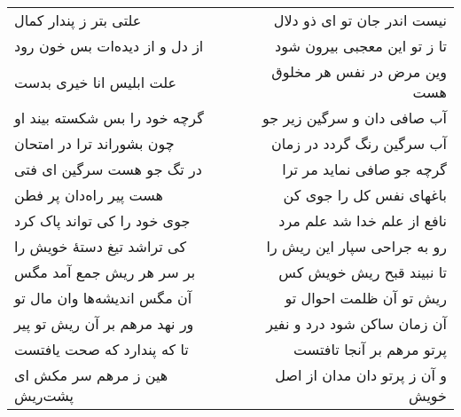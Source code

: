 \begin{center}
\begin{longtable}{l p{0.5cm} r}
\\
علتی بتر ز پندار کمال
&&
نیست اندر جان تو ای ذو دلال
\\
از دل و از دیده‌ات بس خون رود
&&
تا ز تو این معجبی بیرون شود
\\
علت ابلیس انا خیری بدست
&&
وین مرض در نفس هر مخلوق هست
\\
گرچه خود را بس شکسته بیند او
&&
آب صافی دان و سرگین زیر جو
\\
چون بشوراند ترا در امتحان
&&
آب سرگین رنگ گردد در زمان
\\
در تگ جو هست سرگین ای فتی
&&
گرچه جو صافی نماید مر ترا
\\
هست پیر راه‌دان پر فطن
&&
باغهای نفس کل را جوی کن
\\
جوی خود را کی تواند پاک کرد
&&
نافع از علم خدا شد علم مرد
\\
کی تراشد تیغ دستهٔ خویش را
&&
رو به جراحی سپار این ریش را
\\
بر سر هر ریش جمع آمد مگس
&&
تا نبیند قبح ریش خویش کس
\\
آن مگس اندیشه‌ها وان مال تو
&&
ریش تو آن ظلمت احوال تو
\\
ور نهد مرهم بر آن ریش تو پیر
&&
آن زمان ساکن شود درد و نفیر
\\
تا که پندارد که صحت یافتست
&&
پرتو مرهم بر آنجا تافتست
\\
هین ز مرهم سر مکش ای پشت‌ریش
&&
و آن ز پرتو دان مدان از اصل خویش
\\
\end{longtable}
\end{center}
